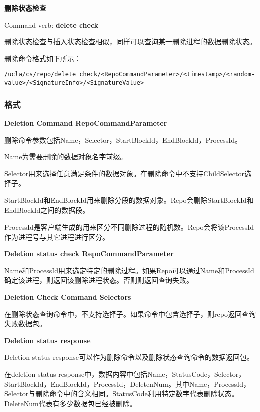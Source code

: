 \textbf{删除状态检查}

Command verb: \textbf{delete check}

删除状态检查与插入状态检查相似，同样可以查询某一删除进程的数据删除状态。

删除命令格式如下所示：

\begin{framed}
\begin{scriptsize}
\begin{verbatim}
/ucla/cs/repo/delete check/<RepoCommandParameter>/<timestamp>/<random-value>/<SignatureInfo>/<SignatureValue>
\end{verbatim}
\end{scriptsize}
\end{framed}

\subsubsection{格式}
\textbf{Deletion Command RepoCommandParameter}

删除命令参数包括Name，Selector，StartBlockId，EndBlockId，ProcessId。

Name为需要删除的数据对象名字前缀。

Selector用来选择任意满足条件的数据对象。在删除命令中不支持ChildSelector选择子。

StartBlockId和EndBlockId用来删除分段的数据对象。Repo会删除StartBlockId和EndBlockId之间的数据段。

ProcessId是客户端生成的用来区分不同删除过程的随机数。Repo会将该ProcessId作为进程号与其它进程进行区分。

\textbf{Deletion status check RepoCommandParameter}

Name和ProcessId用来选定特定的删除过程。如果Repo可以通过Name和ProcessId确定该进程，则返回该删除进程状态。否则则返回查询失败。

\textbf{Deletion Check Command Selectors}

在删除状态查询命令中，不支持选择子。如果命令中包含选择子，则repo返回查询失败数据包。

\textbf{Deletion status response}

Deletion status response可以作为删除命令以及删除状态查询命令的数据返回包。

在deletion status response中，数据内容中包括Name，StatusCode，Selector，StartBlockId，EndBlockId，ProcessId，DeletenNum。其中Name，ProcessId，Selector与删除命令中的含义相同。StatusCode利用特定数字代表删除状态。DeleteNum代表有多少数据包已经被删除。

